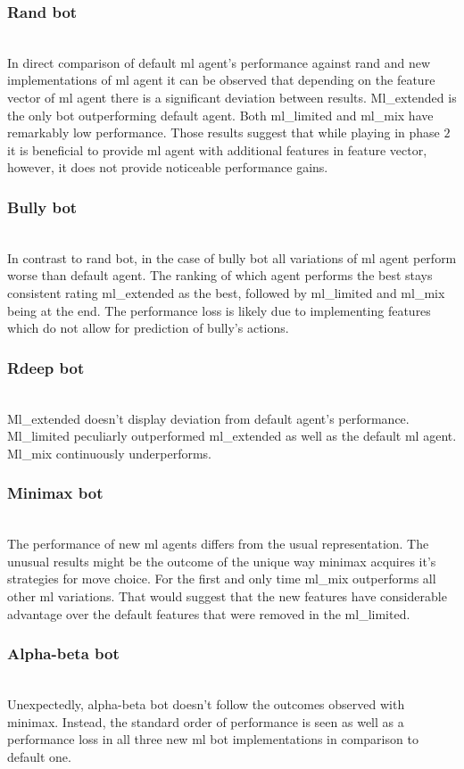 \documentclass[master]{subfiles}
\begin{document}
\subsubsection{Rand bot} 
\hfill\\
In direct comparison of default ml agent's performance against rand and new implementations of ml agent it can be observed that depending on the feature vector of ml agent there is a significant deviation between results. Ml\_extended is the only bot outperforming default agent. Both ml\_limited and ml\_mix have remarkably low performance. Those results suggest that while playing in phase $2$ it is beneficial to provide ml agent with additional features in feature vector, however, it does not provide noticeable performance gains. 
\subsubsection{Bully bot} 
\hfill\\
In contrast to rand bot, in the case of bully bot all variations of ml agent perform worse than default agent. The ranking of which agent performs the best stays consistent rating ml\_extended as the best, followed by ml\_limited and ml\_mix being at the end. The performance loss is likely due to implementing features which do not allow for prediction of bully's actions.
\subsubsection{Rdeep bot} 
\hfill\\
Ml\_extended doesn't display deviation from default agent's performance. Ml\_limited peculiarly outperformed ml\_extended as well as the default ml agent. Ml\_mix continuously underperforms.
\subsubsection{Minimax bot} 
\hfill\\
The performance of new ml agents differs from the usual representation. The unusual results might be the outcome of the unique way minimax acquires it's strategies for move choice. For the first and only time ml\_mix outperforms all other ml variations. That would suggest that the new features have considerable advantage over the default features that were removed in the ml\_limited.
\subsubsection{Alpha-beta bot} 
\hfill\\
Unexpectedly, alpha-beta bot doesn't follow the outcomes observed with minimax. Instead, the standard order of performance is seen as well as a performance loss in all three new ml bot implementations in comparison to default one.
\end{document}
